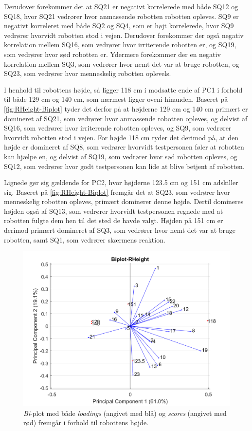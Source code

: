Derudover forekommer det at SQ21 er negativt korrelerede med både SQ12 og SQ18, hvor SQ21 vedrører hvor anmassende robotten robotten opleves. SQ9 er negativt korreleret med både SQ2 og SQ4, som er højt korrelerede, hvor SQ9 vedrører hvorvidt robotten stod i vejen. Derudover forekommer der også negativ korrelation mellem SQ16, som vedrører hvor irriterende robotten er, og SQ19, som vedrører hvor sød robotten er. Ydermere forekommer der en negativ korrelation mellem SQ3, som vedrører hvor nemt det var at bruge robotten, og SQ23, som vedrører hvor menneskelig robotten oplevels.  

I henhold til robottens højde, så ligger 118 cm i modsatte ende af PC1 i forhold til både 129 cm og 140 cm, som nærmest ligger oveni hinanden. Baseret på \autoref{fig:RHeight-Biplot} tyder det derfor på at højderne 129 cm og 140 cm primært er domineret af SQ21, som vedrører hvor anmassende robotten opleves, og delvist af SQ16, som vedrører hvor irriterende robotten opleves, og SQ9, som vedrører hvorvidt robotten stod i vejen. For højde 118 cm tyder det derimod på, at den højde er domineret af SQ8, som vedrører hvorvidt testpersonen føler at robotten kan hjælpe en, og delvist af SQ19, som vedrører hvor sød robotten opleves, og SQ12, som vedrører hvor godt testpersonen kan lide at blive betjent af robotten. 

Lignede gør sig gældende for PC2, hvor højderne 123.5 cm og 151 cm adskiller sig. Baseret på \autoref{fig:RHeight-Biplot} fremgår det at SQ23, som vedrører hvor menneskelig robotten opleves, primært dominerer denne højde. Dertil domineres højden også af SQ13, som vedrører hvorvidt testpersonen regnede med at robotten fulgte dem hen til det sted de havde valgt. Højden på 151 cm er derimod primært domineret af SQ3, som vedrører hvor nemt det var at bruge robotten, samt SQ1, som vedrører skærmens reaktion. 
%
\begin{figure}[H]
\centering
\includegraphics[width=\textwidth]{Figure/DatabehandlingSkalaer/PCAfigures/RHeight-Biplot.png}
\caption{\textit{Bi}-plot med både \textit{loadings} (angivet med blå) og \textit{scores} (angivet med rød) fremgår i forhold til robottens højde.}
\label{fig:RHeight-Biplot}
\end{figure}
\noindent
%

